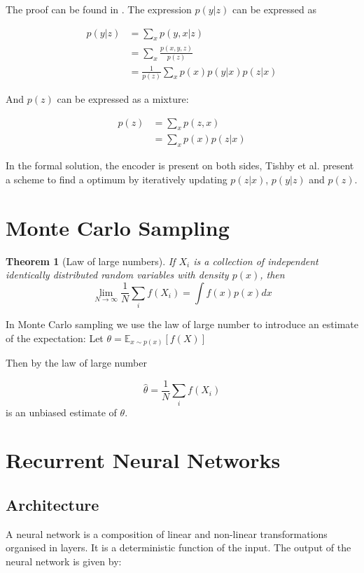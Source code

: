 \documentclass[10pt,oneside,openright]{report}
\newtheorem{theorem}{Theorem}
\begin{document}
The proof can be found in \cite{tishby}. The expression $p(y|z)$ can be expressed as 
 
 \begin{align}
p(y|z) &= \sum_x p(y, x|z)  \\
	 & = \sum_x \frac{p(x ,y, z)}{p(z)} \\
	 &= \frac{1}{p(z)} \sum_x p(x) p(y|x) p (z|x) 
\label{eq:y_given_z}
\end{align}

And $p(z)$ can be expressed as a mixture:
 
  \begin{align}
p(z) &= \sum_x p(z, x)  \\
	 &= \sum_x p(x) p(z|x)
\label{eq:z_post}
\end{align}

In the formal solution, the encoder is present on both sides, Tishby et al. present a scheme to find a optimum by iteratively updating $p(z|x)$, $p(y|z)$ and $p(z)$.

\section{Monte Carlo Sampling}
\begin{theorem}[Law of large numbers]
If $X_i$ is a collection of independent identically distributed random variables with density $p(x)$, then
$$ \lim_{N \to \infty} \frac{1}{N} \sum_i f(X_i) = \int f(x) p(x) dx $$
\end{theorem}

In Monte Carlo sampling we use the law of large number to introduce an estimate  of the expectation:
Let $\theta = \mathbb{E}_{x \sim p(x)}[f(X)]$

Then by the law of large number 

$$ \hat{\theta} =  \frac{1}{N} \sum_i f(X_i) $$ is an unbiased estimate of $\theta$.

\section{Recurrent Neural Networks}

\subsection{Architecture}
A neural network is a composition of linear and non-linear transformations organised in layers. It is a deterministic function of the input. The output of the neural network is given by:
\end{document}
